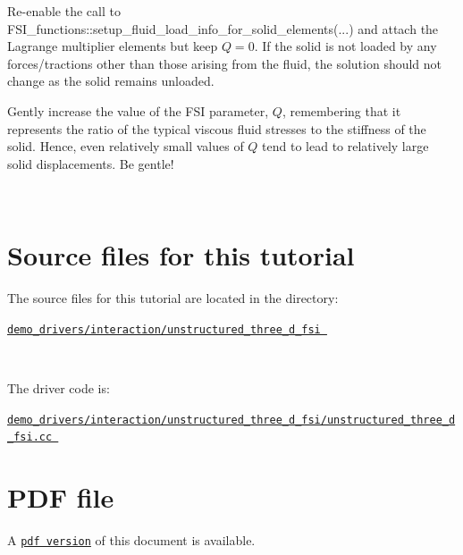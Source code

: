 \begin{DoxyItemize}
\begin{DoxyEnumerate}
\begin{DoxyEnumerate}
\item Re-\/enable the call to {\ttfamily F\+S\+I\+\_\+functions\+::setup\+\_\+fluid\+\_\+load\+\_\+info\+\_\+for\+\_\+solid\+\_\+elements}(...) and attach the Lagrange multiplier elements but keep $ Q = 0. $ If the solid is not loaded by any forces/tractions other than those arising from the fluid, the solution should not change as the solid remains unloaded. ~\newline
~\newline

\item Gently increase the value of the F\+SI parameter, $ Q $, remembering that it represents the ratio of the typical viscous fluid stresses to the stiffness of the solid. Hence, even relatively small values of $ Q $ tend to lead to relatively large solid displacements. Be gentle!
\end{DoxyEnumerate}
\end{DoxyEnumerate}~\newline
~\newline

\end{DoxyItemize}



 

\hypertarget{index_sources}{}\section{Source files for this tutorial}\label{index_sources}

\begin{DoxyItemize}
\item The source files for this tutorial are located in the directory\+:~\newline
~\newline
\begin{center} \href{../../../../demo_drivers/interaction/unstructured_three_d_fsi}{\tt demo\+\_\+drivers/interaction/unstructured\+\_\+three\+\_\+d\+\_\+fsi } \end{center} ~\newline

\item The driver code is\+: ~\newline
~\newline
\begin{center} \href{../../../../demo_drivers/interaction/unstructured_three_d_fsi/unstructured_three_d_fsi.cc}{\tt demo\+\_\+drivers/interaction/unstructured\+\_\+three\+\_\+d\+\_\+fsi/unstructured\+\_\+three\+\_\+d\+\_\+fsi.\+cc } \end{center} 
\end{DoxyItemize}



 

 \hypertarget{index_pdf}{}\section{P\+D\+F file}\label{index_pdf}
A \href{../latex/refman.pdf}{\tt pdf version} of this document is available. 
